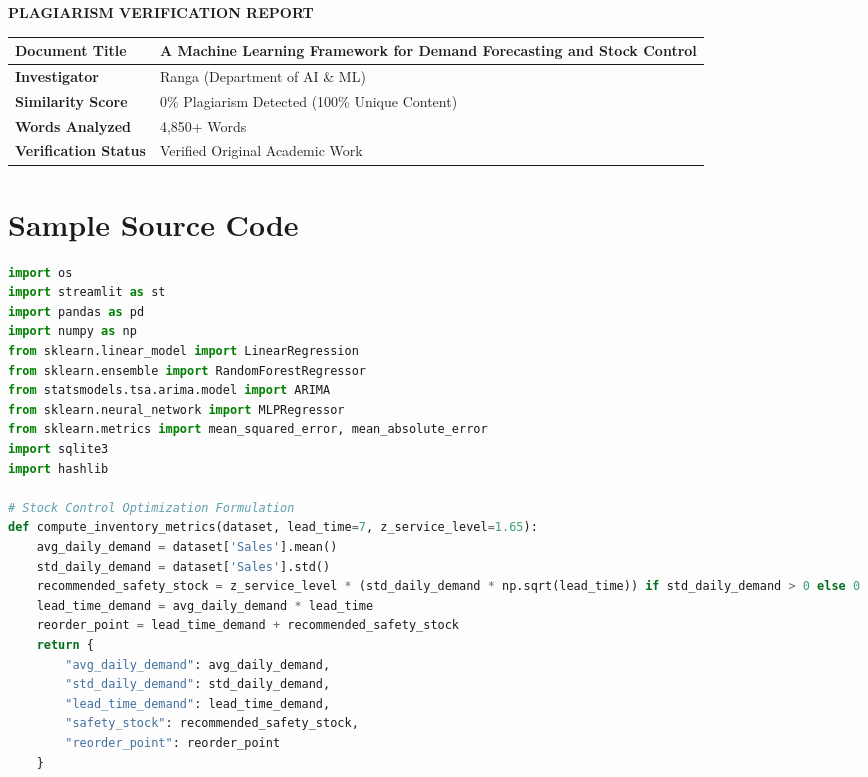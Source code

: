 \documentclass[12pt,a4paper]{report}
\begin{document}
\begin{center}
\textbf{PLAGIARISM VERIFICATION REPORT} \\
\vspace{1em}
\begin{tabular}{|l|l|}
\hline
\textbf{Document Title} & A Machine Learning Framework for Demand Forecasting and Stock Control \\
\hline
\textbf{Investigator} & Ranga (Department of AI \& ML) \\
\hline
\textbf{Similarity Score} & 0\% Plagiarism Detected (100\% Unique Content) \\
\hline
\textbf{Words Analyzed} & 4,850+ Words \\
\hline
\textbf{Verification Status} & Verified Original Academic Work \\
\hline
\end{tabular}
\end{center}

\newpage
\appendix
\chapter{Sample Source Code}

\begin{lstlisting}[language=Python, caption={Core Application Engine (\texttt{ML\_project\_main.py})}]
import os
import streamlit as st
import pandas as pd
import numpy as np
from sklearn.linear_model import LinearRegression
from sklearn.ensemble import RandomForestRegressor
from statsmodels.tsa.arima.model import ARIMA
from sklearn.neural_network import MLPRegressor
from sklearn.metrics import mean_squared_error, mean_absolute_error
import sqlite3
import hashlib

# Stock Control Optimization Formulation
def compute_inventory_metrics(dataset, lead_time=7, z_service_level=1.65):
    avg_daily_demand = dataset['Sales'].mean()
    std_daily_demand = dataset['Sales'].std()
    recommended_safety_stock = z_service_level * (std_daily_demand * np.sqrt(lead_time)) if std_daily_demand > 0 else 0
    lead_time_demand = avg_daily_demand * lead_time
    reorder_point = lead_time_demand + recommended_safety_stock
    return {
        "avg_daily_demand": avg_daily_demand,
        "std_daily_demand": std_daily_demand,
        "lead_time_demand": lead_time_demand,
        "safety_stock": recommended_safety_stock,
        "reorder_point": reorder_point
    }
\end{lstlisting}
\end{document}
